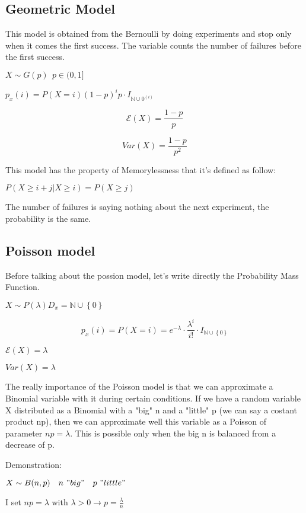 \documentclass{article}
\begin{document}
\subsection{Geometric Model}

This model is obtained from the Bernoulli by doing experiments and stop only when it comes the first success. The variable counts the number of failures before the first success. 
\bigskip

$X \sim G(p) \ \ p \in (0,1]$

$p_x(i) = P(X=i) (1-p)^i p \cdot I_{\mathbb{N} \cup {0}^(i)}$
\bigskip

$$\mathcal E(X) = \frac{1-p}{p}$$

$$Var(X) = \frac{1-p}{p^2}$$
\bigskip

This model has the property of Memorylessness that it's defined as follow:

$P(X \geq i + j| X \geq i) = P(X \geq j)$

The number of failures is saying nothing about the next experiment, the probability is the same.

\subsection{Poisson model}

Before talking about the possion model, let's write directly the Probability Mass Function.

$X \sim P(\lambda) D_x = \mathbb{N} \cup \left\{0\right\}$
\bigskip

$$p_x(i) = P(X=i) = e^{- \lambda} \cdot \frac{\lambda^i}{i!} \cdot I_{\mathbb{N} \cup \left\{0\right\}}$$

\bigskip

$\mathcal E(X) = \lambda$

$Var(X) = \lambda$
\bigskip

The really importance of the Poisson model is that we can approximate a Binomial variable with it during certain conditions.
If we have a random variable X distributed as a Binomial with a "big" n and a "little" p (we can say a costant product np), then we can approximate well this variable as a Poisson of parameter $np = \lambda$.
This is possible only when the big n is balanced from a decrease of p.

\bigskip

Demonstration:

$X \sim B(n,p) \ \ \ n \ "big" \ \ \ p \ "little"$

I set $np = \lambda$ with $\lambda > 0 \longrightarrow p = \frac{\lambda}{n}$
\end{document}
